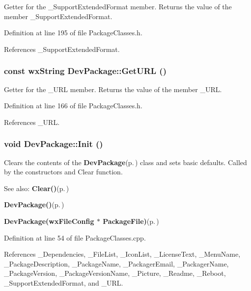 Getter for the \_\-Support\-Extended\-Format member. Returns the value of the member \_\-Support\-Extended\-Format. 

Definition at line 195 of file Package\-Classes.h.

References \_\-Support\-Extended\-Format.
\subsubsection{\setlength{\rightskip}{0pt plus 5cm}const wx\-String Dev\-Package::Get\-URL ()\hspace{0.3cm}{\tt  [inline]}}\label{class_dev_package_057041ecac0d717d222033649e803e10}


Getter for the \_\-URL member. Returns the value of the member \_\-URL. 

Definition at line 166 of file Package\-Classes.h.

References \_\-URL.
\subsubsection{\setlength{\rightskip}{0pt plus 5cm}void Dev\-Package::Init ()\hspace{0.3cm}{\tt  [private]}}\label{class_dev_package_2dc9c10c045fa1b172d1c5bad4cd4298}


Clears the contents of the {\bf Dev\-Package}{\rm (p.\,\pageref{class_dev_package})} class and sets basic defaults. Called by the constructors and Clear function. \begin{Desc}
\item[See also:]{\bf Clear()}{\rm (p.\,\pageref{class_dev_package_9c7c89cacc4fa0db700e3a550d4b809d})} 

{\bf Dev\-Package()}{\rm (p.\,\pageref{class_dev_package_9a3a9e60eb3eebae2db59060bfb71348})} 

{\bf Dev\-Package(wx\-File\-Config $\ast$ Package\-File)}{\rm (p.\,\pageref{class_dev_package_40d29cdd7e1ec43bde701b6c0a6f5291})} \end{Desc}


Definition at line 54 of file Package\-Classes.cpp.

References \_\-Dependencies, \_\-File\-List, \_\-Icon\-List, \_\-License\-Text, \_\-Menu\-Name, \_\-Package\-Description, \_\-Package\-Name, \_\-Packager\-Email, \_\-Packager\-Name, \_\-Package\-Version, \_\-Package\-Version\-Name, \_\-Picture, \_\-Readme, \_\-Reboot, \_\-Support\-Extended\-Format, and \_\-URL.


